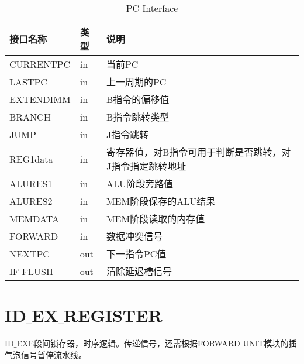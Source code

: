 \begin{table}[H]
\begin{center}
\renewcommand{\arraystretch}{1.3}
\small
\caption{PC Interface}
\label{tab:treatments}
\begin{tabular}{|p{3cm}<{\centering}|p{1.4cm}<{\centering}|p{7cm}<{\centering}|}
\hline
接口名称 & 类型 & 说明 \\
\hline
CURRENTPC & in & 当前PC \\
\hline
LASTPC & in & 上一周期的PC \\
\hline
EXTENDIMM & in & B指令的偏移值 \\
\hline
BRANCH & in & B指令跳转类型 \\
\hline
JUMP & in & J指令跳转 \\
\hline
REG1data & in & 寄存器值，对B指令可用于判断是否跳转，对J指令指定跳转地址 \\
\hline
ALURES1 & in & ALU阶段旁路值 \\
\hline
ALURES2 & in & MEM阶段保存的ALU结果 \\
\hline
MEMDATA & in &  MEM阶段读取的内存值 \\
\hline
FORWARD & in & 数据冲突信号 \\
\hline
NEXTPC & out & 下一指令PC值 \\
\hline
IF$\_$FLUSH & out & 清除延迟槽信号 \\
\hline
\end{tabular}
\end{center}
\end{table}


\section{ID$\_$EX$\_$REGISTER}

ID$\_$EXE段间锁存器，时序逻辑。传递信号，还需根据FORWARD UNIT模块的插气泡信号暂停流水线。

